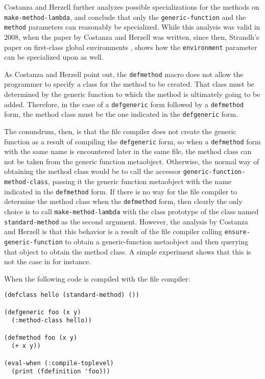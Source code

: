 Costanza and Herzell further analyzes possible specializations for the
methods on \texttt{make-method-lambda}, and conclude that only the
\texttt{generic-function} and the \texttt{method} parameters can
reasonably be specialized.  While this analysis was valid in 2008,
when the paper by Costanza and Herzell was written, since then,
Strandh's paper on first-class global environments
\cite{Strandh:2015:ELS:Environments}, shows how the
\texttt{environment} parameter can be specialized upon as well.

As Costanza and Herzell point out, the \texttt{defmethod} macro does
not allow the programmer to specify a class for the method to be
created.  That class must be determined by the generic function to
which the method is ultimately going to be added.  Therefore, in the
case of a \texttt{defgeneric} form followed by a \texttt{defmethod}
form, the method class must be the one indicated in the
\texttt{defgeneric} form.

The conundrum, then, is that the file compiler does not create the
generic function as a result of compiling the \texttt{defgeneric}
form, so when a \texttt{defmethod} form with the same name is
encountered later in the same file, the method class can not be taken
from the generic function metaobject.  Otherwise, the normal way of
obtaining the method class would be to call the accessor
\texttt{generic-function-method-class}, passing it the generic
function metaobject with the name indicated in the \texttt{defmethod}
form.  If there is no way for the file compiler to determine the
method class when the \texttt{defmethod} form, then clearly the only
choice is to call \texttt{make-method-lambda} with the class prototype
of the class named \texttt{standard-method} as the second argument.
However, the analysis by Costanza and Herzell is that this behavior is
a result of the file compiler calling \texttt{ensure-generic-function}
to obtain a generic-function metaobject and then querying that object
to obtain the method class.  A simple experiment shows that this is
not the case in \sbcl{} for instance.

When the following code is compiled with the \sbcl{} file compiler:

\begin{verbatim}
(defclass hello (standard-method) ())

(defgeneric foo (x y)
  (:method-class hello))

(defmethod foo (x y)
  (+ x y))

(eval-when (:compile-toplevel)
  (print (fdefinition 'foo)))
\end{verbatim}

